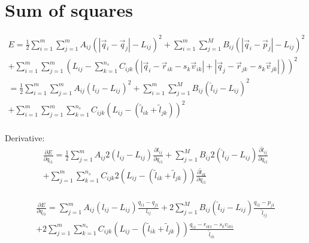 \documentclass{article}
\begin{document}
\section{Sum of squares}
\label{fold-retina:sec:sum-squares}

\begin{equation}
  \begin{split}
    E = \frac{1}{2} \sum_{i=1}^m \sum_{j=1}^m A_{ij} (|\vec{q}_i -
    \vec{q}_j|-L_{ij})^2
    +  \sum_{i=1}^m \sum_{j=1}^M B_{ij} (|\vec{q}_i -
    \vec{p}_j| - L_{ij})^2 \\
    + \sum_{i=1}^m \sum_{j=1}^m \left(L_{ij} -   \sum_{k=1}^{n_s}C_{ijk}(|\vec{q}_i -
      \vec{r}_{ik} - s_k\vec{v}_{ik}| +|\vec{q}_j -
      \vec{r}_{jk} - s_k\vec{v}_{jk}|)
    \right)^2 \\
    = \frac{1}{2} \sum_{i=1}^m \sum_{j=1}^m A_{ij} (l_{ij}-L_{ij})^2
    + \sum_{i=1}^m \sum_{j=1}^M B_{ij} (\hat l_{ij} - L_{ij})^2 \\
    + \sum_{i=1}^m \sum_{j=1}^m \sum_{k=1}^{n_s} C_{ijk} \left(L_{ij} -
      (\tilde l_{ik} + \tilde l_{jk})
    \right)^2 \\
  \end{split}
\end{equation}

Derivative:
\begin{equation}
  \begin{split}
    \frac{\partial E}{\partial q_{i1}} = 
    \frac{1}{2} \sum_{j=1}^m A_{ij} 2(l_{ij}-L_{ij})
    \frac{\partial l_{ij}}{\partial{q_{i1}}}
    + \sum_{j=1}^M B_{ij} 2(\hat l_{ij} -
    L_{ij})\frac{\partial \hat l_{ij}}{\partial{q_{i1}}}\\
    + \sum_{j=1}^m \sum_{k=1}^{n_s}C_{ijk}2 \left(L_{ij} -
      (\tilde l_{ik} + \tilde l_{jk}) 
    \right)     \frac{\partial \tilde l_{ik}}{\partial{q_{i1}}}  \\
  \end{split}
\end{equation}

\begin{equation}
  \begin{split}
    \frac{\partial E}{\partial q_{i1}} = 
     \sum_{j=1}^m A_{ij} (l_{ij}-L_{ij})
    \frac{q_{i1} - q_{j1}}{l_{ij}}
    + 2\sum_{j=1}^M B_{ij} (\hat l_{ij} -
    L_{ij})    \frac{q_{i1} - p_{j1}}{\hat l_{ij}}
\\
    + 2\sum_{j=1}^m \sum_{k=1}^{n_s}C_{ijk} \left(L_{ij} -
      (\tilde l_{ik} + \tilde l_{jk}) 
    \right)   \frac{q_{i1} - r_{ik1} - s_k v_{ik1}}{\tilde l_{ik}} \\
  \end{split}
\end{equation}
\end{document}
